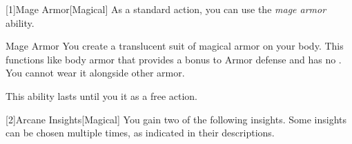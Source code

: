         [1]{Mage Armor}[Magical] As a standard action, you can use the \textit{mage armor} ability.
        \begin{ability}{Mage Armor}
            You create a translucent suit of magical armor on your body.
            This functions like body armor that provides a  bonus to Armor defense and has no .
            You cannot wear it alongside other armor.

            This ability lasts until you  it as a free action.
        \end{ability}

        [2]{Arcane Insights}[Magical]
        You gain two of the following insights.
        Some insights can be chosen multiple times, as indicated in their descriptions.

